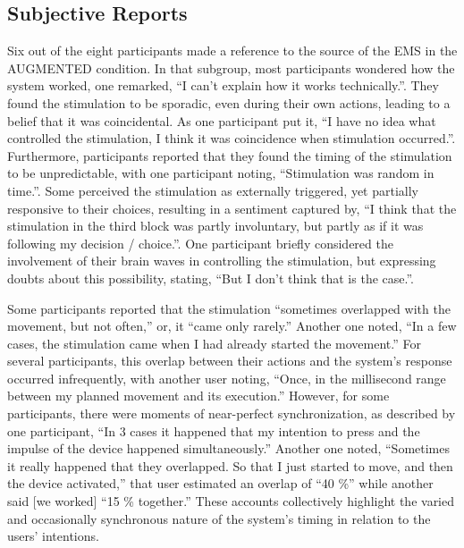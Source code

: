 \subsection{Subjective Reports}
Six out of the eight participants made a reference to the source of the EMS in the AUGMENTED condition. In that subgroup, most participants wondered how the system worked, one remarked, ``I can't explain how it works technically.''. They found the stimulation to be sporadic, even during their own actions, leading to a belief that it was coincidental. As one participant put it, ``I have no idea what controlled the stimulation, I think it was coincidence when stimulation occurred.''. Furthermore, participants reported that they found the timing of the stimulation to be unpredictable, with one participant noting, ``Stimulation was random in time.''. Some perceived the stimulation as externally triggered, yet partially responsive to their choices, resulting in a sentiment captured by, ``I think that the stimulation in the third block was partly involuntary, but partly as if it was following my decision / choice.''. One participant briefly considered the involvement of their brain waves in controlling the stimulation, but expressing doubts about this possibility, stating, ``But I don't think that is the case.''.

Some participants reported that the stimulation ``sometimes overlapped with the movement, but not often,'' or, it ``came only rarely.'' Another one noted, ``In a few cases, the stimulation came when I had already started the movement.'' For several participants, this overlap between their actions and the system's response occurred infrequently, with another user noting, ``Once, in the millisecond range between my planned movement and its execution.'' However, for some participants, there were moments of near-perfect synchronization, as described by one participant, ``In 3 cases it happened that my intention to press and the impulse of the device happened simultaneously.'' Another one noted, ``Sometimes it really happened that they overlapped. So that I just started to move, and then the device activated,'' that user estimated an overlap of ``40 \%'' while another said [we worked] ``15 \% together.'' These accounts collectively highlight the varied and occasionally synchronous nature of the system's timing in relation to the users' intentions.

